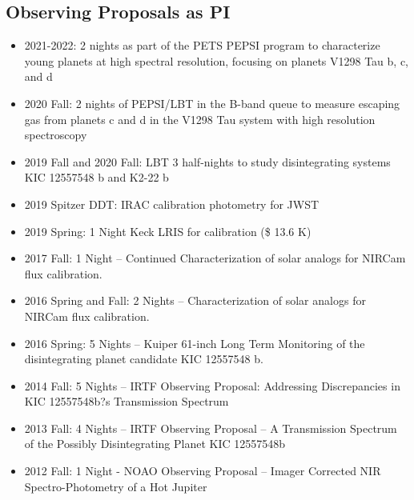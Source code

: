 \documentclass[11pt, oneside]{article}   	%
\begin{document}
\subsection*{Observing Proposals as PI}
\begin{itemize}[noitemsep]
    \item 2021-2022: 2 nights as part of the PETS PEPSI program to characterize young planets at high spectral resolution, focusing on planets V1298 Tau b, c, and d
    \item 2020 Fall: 2 nights of PEPSI/LBT in the B-band queue to measure escaping gas from planets c and d in the V1298 Tau system with high resolution spectroscopy
    \item 2019 Fall and 2020 Fall: LBT 3 half-nights to study disintegrating systems KIC 12557548 b and K2-22 b
    \item 2019 Spitzer DDT: IRAC calibration photometry for JWST
    \item 2019 Spring: 1 Night Keck LRIS for calibration (\$ 13.6 K)
    \item 2017 Fall: 1 Night -- Continued Characterization of solar analogs for NIRCam flux calibration.
    \item 2016 Spring and Fall: 2 Nights -- Characterization of solar analogs for NIRCam flux calibration.
    \item 2016 Spring: 5 Nights -- Kuiper 61-inch Long Term Monitoring of the disintegrating planet candidate KIC 12557548 b.
    \item 2014 Fall: 5 Nights -- IRTF Observing Proposal: Addressing Discrepancies in KIC 12557548b?s Transmission Spectrum
    \item 2013 Fall: 4 Nights -- IRTF Observing Proposal -- A Transmission Spectrum of the Possibly Disintegrating Planet KIC 12557548b
    \item 2012 Fall: 1 Night - NOAO Observing Proposal -- Imager Corrected NIR Spectro-Photometry of a Hot Jupiter
\end{itemize}

\end{document}
